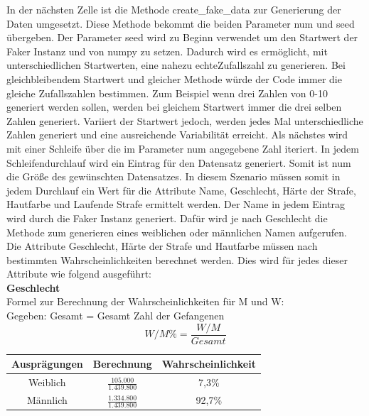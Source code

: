 \begin{onehalfspace}
In der nächsten Zelle ist die Methode \glqq{}create\_fake\_data\grqq{} zur Generierung der Daten umgesetzt. Diese Methode bekommt die beiden Parameter num und seed übergeben. Der Parameter seed wird zu Beginn verwendet um den Startwert der Faker Instanz und von \glqq{}numpy\grqq{} zu setzen. Dadurch wird es ermöglicht, mit unterschiedlichen Startwerten, eine nahezu \glqq{}echte\grqq{}Zufallszahl zu generieren. Bei gleichbleibendem Startwert und gleicher Methode würde der Code immer die gleiche Zufallszahlen bestimmen. Zum Beispiel wenn drei Zahlen von 0-10 generiert werden sollen, werden bei gleichem Startwert immer die drei selben Zahlen generiert. Variiert der Startwert jedoch, werden jedes Mal unterschiedliche Zahlen generiert und eine ausreichende Variabilität erreicht. Als nächstes wird mit einer Schleife über die im Parameter num angegebene Zahl iteriert. In jedem Schleifendurchlauf wird ein Eintrag für den Datensatz generiert. Somit ist num die Größe des gewünschten Datensatzes. In diesem Szenario müssen somit in jedem Durchlauf ein Wert für die Attribute Name, Geschlecht, Härte der Strafe, Hautfarbe und Laufende Strafe ermittelt werden. Der Name in jedem Eintrag wird durch die Faker Instanz generiert. Dafür wird je nach Geschlecht die Methode zum generieren eines weiblichen oder männlichen Namen aufgerufen. Die Attribute Geschlecht, Härte der Strafe und Hautfarbe müssen nach bestimmten Wahrscheinlichkeiten berechnet werden. Dies wird für jedes dieser Attribute wie folgend ausgeführt:\\
\textbf{Geschlecht}\\
Formel zur Berechnung der Wahrscheinlichkeiten für \ac{M} und \ac{W}:\\
Gegeben: Gesamt = Gesamt Zahl der Gefangenen\\
\begin{equation}
    W/M\% = \frac{W/M}{Gesamt}\label{eq:Sz1Mänlich}
\end{equation}
\begin{table}[!h]
    \centering
    \begin{tabular}{|c|c|c|}
    \hline
    \textbf{Ausprägungen} & \textbf{Berechnung} & \textbf{Wahrscheinlichkeit} \\ \hline
    Weiblich              &\rule{0pt}{18pt} $\frac{105.000}{1.439.800}$  & 7,3\% \\[8pt] \hline
    Männlich              & \rule{0pt}{18pt}$\frac{1.334.800}{1.439.800}$     & 92,7\%  \\[8pt] \hline
    \end{tabular}

\end{table}
\end{onehalfspace}
